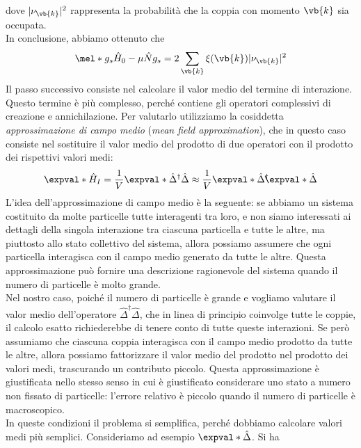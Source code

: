 dove $|\nu_{\vb{k}}|^2$ rappresenta la probabilità che la coppia con momento $\vb{k}$ sia occupata.\\
In conclusione, abbiamo ottenuto che
\begin{equation*}
   \mel*{g_s}{\hat{H}_0 - \mu \hat{N}}{g_s}
   =2\sum_{\vb{k}} \xi(\vb{k}) |\nu_{\vb{k}}|^2
\end{equation*}
Il passo successivo consiste nel calcolare il valor medio del termine di interazione. Questo termine è più complesso, perché contiene gli operatori complessivi di creazione e annichilazione. Per valutarlo utilizziamo la cosiddetta \textit{approssimazione di campo medio} (\textit{mean field approximation}), che in questo caso consiste nel sostituire il valor medio del prodotto di due operatori con il prodotto dei rispettivi valori medi:
\begin{equation*}
   \expval*{\hat{H}_I}
   =\frac{1}{V} \expval*{\hat{\Delta}^{\dag} \hat{\Delta}}
   \approx \frac{1}{V} \expval*{\hat{\Delta}^{\dag}} \hspace{-0.17cm} \expval*{\hat{\Delta}}
\end{equation*}
L'idea dell'approssimazione di campo medio è la seguente: se abbiamo un sistema costituito da molte particelle tutte interagenti tra loro, e non siamo interessati ai dettagli della singola interazione tra ciascuna particella e tutte le altre, ma piuttosto allo stato collettivo del sistema, allora possiamo assumere che ogni particella interagisca con il campo medio generato da tutte le altre. Questa approssimazione può fornire una descrizione ragionevole del sistema quando il numero di particelle è molto grande.\\
Nel nostro caso, poiché il numero di particelle è grande e vogliamo valutare il valor medio dell'operatore $\hat{\Delta}^{\dag}\hat{\Delta}$, che in linea di principio coinvolge tutte le coppie, il calcolo esatto richiederebbe di tenere conto di tutte queste interazioni. Se però assumiamo che ciascuna coppia interagisca con il campo medio prodotto da tutte le altre, allora possiamo fattorizzare il valor medio del prodotto nel prodotto dei valori medi, trascurando un contributo piccolo. Questa approssimazione è giustificata nello stesso senso in cui è giustificato considerare uno stato a numero non fissato di particelle: l'errore relativo è piccolo quando il numero di particelle è macroscopico.\\
In queste condizioni il problema si semplifica, perché dobbiamo calcolare valori medi più semplici. Consideriamo ad esempio $\expval*{\hat{\Delta}}$. Si ha
